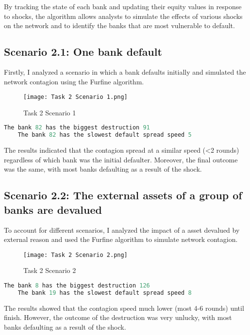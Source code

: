 By tracking the state of each bank and updating their equity values in response to shocks, the algorithm allows analysts to simulate the effects of various shocks on the network and to identify the banks that are most vulnerable to default.

\subsection{Scenario 2.1: One bank default}
Firstly, I analyzed a scenario in which a bank defaults initially and simulated the network contagion using the Furfine algorithm. 

\begin{figure}[H]
    \centering
    \texttt{[image: Task 2 Scenario 1.png]}
    \caption{Task 2 Scenario 1}\label{fig:Task 2 Scenario 1}
\end{figure}

\begin{lstlisting}[language=python]
    The bank 82 has the biggest destruction 91
    The bank 82 has the slowest default spread speed 5
\end{lstlisting}

The results indicated that the contagion spread at a similar speed (<2 rounds) regardless of which bank was the initial defaulter. Moreover, the final outcome was the same, with most banks defaulting as a result of the shock.

\subsection{Scenario 2.2: The external assets of a group of banks are devalued}

To account for different scenarios, I analyzed the impact of a asset devalued by external reason and used the Furfine algorithm to simulate network contagion. 

\begin{figure}[H]
    \centering
    \texttt{[image: Task 2 Scenario 2.png]}
    \caption{Task 2 Scenario 2}\label{fig:Task 2 Scenario 2}
\end{figure}

\begin{lstlisting}[language=python]
    The bank 8 has the biggest destruction 126
    The bank 19 has the slowest default spread speed 8
\end{lstlisting}

The results showed that the contagion speed much lower (most 4-6 rounds) until finish. However, the outcome of the destruction was very unlucky, with most banks defaulting as a result of the shock.

